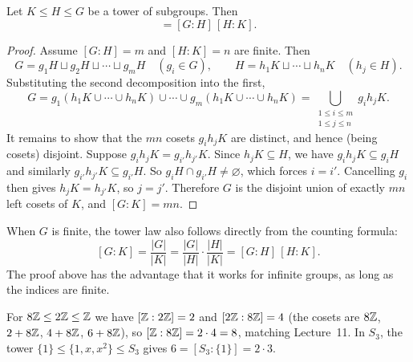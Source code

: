 \documentclass[reqno,11pt]{amsart}
\begin{document}
\begin{theorem}\label{thm:tower}
Let $K\leq H\leq G$ be a tower of subgroups. Then
\begin{equation}
  [G:K]=[G:H]\,[H:K].
\end{equation}
\end{theorem}
\begin{proof}
Assume $[G:H]=m$ and $[H:K]=n$ are finite. Then
\[
  G=g_1H\sqcup g_2H\sqcup\cdots\sqcup g_mH\quad(g_i\in G),
  \qquad
  H=h_1K\sqcup\cdots\sqcup h_nK\quad(h_j\in H).
\]
Substituting the second decomposition into the first,
\[
  G=g_1(h_1K\cup\cdots\cup h_nK)\cup\cdots\cup
    g_m(h_1K\cup\cdots\cup h_nK)
   =\bigcup_{\substack{1\leq i\leq m\\1\leq j\leq n}}g_ih_jK.
\]
It remains to show that the $mn$ cosets $g_ih_jK$ are distinct, and hence
(being cosets) disjoint. Suppose $g_ih_jK=g_{i'}h_{j'}K$. Since
$h_jK\subseteq H$, we have $g_ih_jK\subseteq g_iH$ and similarly
$g_{i'}h_{j'}K\subseteq g_{i'}H$. So $g_iH\cap g_{i'}H\neq\varnothing$,
which forces $i=i'$. Cancelling $g_i$ then gives $h_jK=h_{j'}K$, so
$j=j'$. Therefore $G$ is the disjoint union of exactly $mn$ left cosets
of $K$, and $[G:K]=mn$.
\end{proof}

When $G$ is finite, the tower law also follows directly from the counting
formula:
\[
  [G:K]=\frac{|G|}{|K|}=\frac{|G|}{|H|}\cdot\frac{|H|}{|K|}=[G:H]\,[H:K].
\]
The proof above has the advantage that it works for infinite groups, as
long as the indices are finite.

\begin{example}
For $8\mathbb{Z}\leq2\mathbb{Z}\leq\mathbb{Z}$ we have $[\mathbb{Z}:2\mathbb{Z}]=2$ and $[2\mathbb{Z}:8\mathbb{Z}]=4$ (the cosets
are $8\mathbb{Z}$, $2+8\mathbb{Z}$, $4+8\mathbb{Z}$, $6+8\mathbb{Z}$), so
$[\mathbb{Z}:8\mathbb{Z}]=2\cdot4=8$, matching Lecture~11.
In $S_3$, the tower $\{1\}\leq\{1,x,x^2\}\leq S_3$ gives
$6=[S_3:\{1\}]=2\cdot3$.
\end{example}
\end{document}
